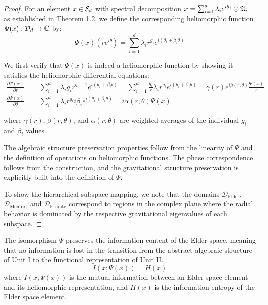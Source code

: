\begin{proof}
For an element $x \in \mathcal{E}_{d}$ with spectral decomposition $x = \sum_{i=1}^{d} \lambda_i e^{i\theta_i} \odot \mathfrak{A}_{i}$ as established in Theorem 1.2, we define the corresponding heliomorphic function $\Psi(x): \mathcal{D}_d \rightarrow \mathbb{C}$ by:
\begin{equation}
\Psi(x)(re^{i\theta}) = \sum_{i=1}^{d} \lambda_i r^{g_i} e^{i(\theta_i + \beta_i \theta)}
\end{equation}

We first verify that $\Psi(x)$ is indeed a heliomorphic function by showing it satisfies the heliomorphic differential equations:
\begin{align}
\frac{\partial \Psi(x)}{\partial r} &= \sum_{i=1}^{d} \lambda_i g_i r^{g_i-1} e^{i(\theta_i + \beta_i \theta)} = \sum_{i=1}^{d} \frac{g_i}{r} \lambda_i r^{g_i} e^{i(\theta_i + \beta_i \theta)} = \gamma(r)e^{i\beta(r,\theta)}\frac{\Psi(x)}{r} \\
\frac{\partial \Psi(x)}{\partial \theta} &= \sum_{i=1}^{d} \lambda_i r^{g_i} i\beta_i e^{i(\theta_i + \beta_i \theta)} = i\alpha(r,\theta)\Psi(x)
\end{align}

where $\gamma(r)$, $\beta(r,\theta)$, and $\alpha(r,\theta)$ are weighted averages of the individual $g_i$ and $\beta_i$ values.

The algebraic structure preservation properties follow from the linearity of $\Psi$ and the definition of operations on heliomorphic functions. The phase correspondence follows from the construction, and the gravitational structure preservation is explicitly built into the definition of $\Psi$.

To show the hierarchical subspace mapping, we note that the domains $\mathcal{D}_{\text{Elder}}$, $\mathcal{D}_{\text{Mentor}}$, and $\mathcal{D}_{\text{Erudite}}$ correspond to regions in the complex plane where the radial behavior is dominated by the respective gravitational eigenvalues of each subspace.
\end{proof}

\begin{corollary}
The isomorphism $\Psi$ preserves the information content of the Elder space, meaning that no information is lost in the transition from the abstract algebraic structure of Unit I to the functional representation of Unit II.
\begin{equation}
I(x; \Psi(x)) = H(x)
\end{equation}
where $I(x; \Psi(x))$ is the mutual information between an Elder space element and its heliomorphic representation, and $H(x)$ is the information entropy of the Elder space element.
\end{corollary}

